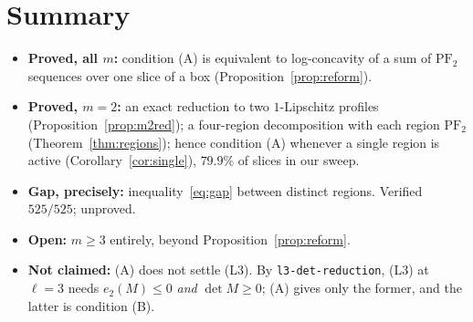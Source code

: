 \documentclass[11pt]{article}
\theoremstyle{plain}
\theoremstyle{definition}
\newcommand{\PFtwo}{\mathrm{PF}_2}
\begin{document}
\section{Summary}

\begin{itemize}
\item \textbf{Proved, all $m$:} condition (A) is equivalent to log-concavity of a sum of
$\PFtwo$ sequences over one slice of a box (Proposition~\ref{prop:reform}).
\item \textbf{Proved, $m=2$:} an exact reduction to two $1$-Lipschitz profiles
(Proposition~\ref{prop:m2red}); a four-region decomposition with each region $\PFtwo$
(Theorem~\ref{thm:regions}); hence condition (A) whenever a single region is active
(Corollary~\ref{cor:single}), $79.9\%$ of slices in our sweep.
\item \textbf{Gap, precisely:} inequality~\eqref{eq:gap} between distinct regions.
Verified $525/525$; unproved.
\item \textbf{Open:} $m\ge3$ entirely, beyond Proposition~\ref{prop:reform}.
\item \textbf{Not claimed:} (A) does not settle (L3). By \texttt{l3-det-reduction},
(L3) at $\ell=3$ needs $e_2(M)\le0$ \emph{and} $\det M\ge0$; (A) gives only the former,
and the latter is condition (B).
\end{itemize}
\end{document}

